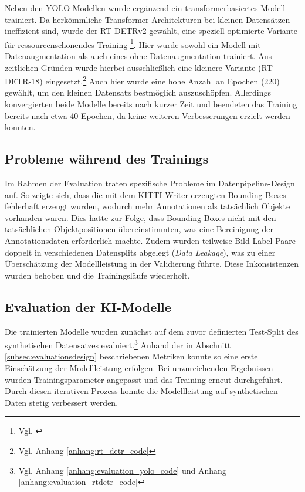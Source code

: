 Neben den \ac{YOLO}-Modellen wurde ergänzend ein transformerbasiertes Modell trainiert. Da herkömmliche Transformer-Architekturen bei kleinen Datensätzen ineffizient sind, wurde der \ac{RT-DETR}v2 gewählt, eine speziell optimierte Variante für ressourcenschonendes Training \footnote{Vgl. \cite{zhao_detrs_2023}}.
Hier wurde sowohl ein Modell mit Datenaugmentation als auch eines ohne Datenaugmentation trainiert. Aus zeitlichen Gründen wurde hierbei ausschließlich eine kleinere Variante (\ac{RT-DETR}-18) eingesetzt.\footnote{Vgl. Anhang \ref{anhang:rt_detr_code}} Auch hier wurde eine hohe Anzahl an Epochen (220) gewählt, um den kleinen Datensatz bestmöglich auszuschöpfen. Allerdings konvergierten beide Modelle bereits nach kurzer Zeit und beendeten das Training bereits nach etwa 40 Epochen, da keine weiteren Verbesserungen erzielt werden konnten.

\subsection{Probleme während des Trainings}
Im Rahmen der Evaluation traten spezifische Probleme im Datenpipeline-Design auf. So zeigte sich, dass die mit dem KITTI-Writer erzeugten Bounding Boxes fehlerhaft erzeugt wurden, wodurch mehr Annotationen als tatsächlich Objekte vorhanden waren. Dies hatte zur Folge, dass Bounding Boxes nicht mit den tatsächlichen Objektpositionen übereinstimmten, was eine Bereinigung der Annotationsdaten erforderlich machte. Zudem wurden teilweise Bild-Label-Paare doppelt in verschiedenen Datensplits abgelegt (\textit{Data Leakage}), was zu einer Überschätzung der Modellleistung in der Validierung führte. Diese Inkonsistenzen wurden behoben und die Trainingsläufe wiederholt.


\subsection[Evaluation der KI-Modelle]{Evaluation der \ac{KI}-Modelle}\label{subsec:umsetzung_evaluation_modelle}
Die trainierten Modelle wurden zunächst auf dem zuvor definierten Test-Split des synthetischen Datensatzes evaluiert.\footnote{Vgl. Anhang \ref{anhang:evaluation_yolo_code} und Anhang \ref{anhang:evaluation_rtdetr_code}} Anhand der in Abschnitt \ref{subsec:evaluationsdesign} beschriebenen Metriken konnte so eine erste Einschätzung der Modellleistung erfolgen. Bei unzureichenden Ergebnissen wurden Trainingsparameter angepasst und das Training erneut durchgeführt. Durch diesen iterativen Prozess konnte die Modellleistung auf synthetischen Daten stetig verbessert werden.

